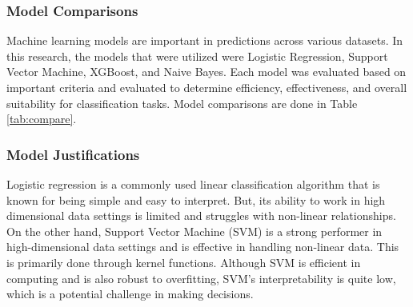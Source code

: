 \documentclass[stu,12pt,floatsintext]{apa7}
\begin{document}
\subsubsection{Model Comparisons}
Machine learning models are important in predictions across various datasets. In this research, the models that were utilized were Logistic Regression, Support Vector Machine, XGBoost, and Naive Bayes. Each model was evaluated based on important criteria and evaluated to determine efficiency, effectiveness, and overall suitability for classification tasks. Model comparisons are done in Table \ref{tab:compare}.

\begin{table}[!htb]
    \centering

    \caption{Theoretical model comparison}

    \label{tab:compare}
\end{table}

\subsubsection{Model Justifications}
Logistic regression is a commonly used linear classification algorithm that is known for being simple and easy to interpret. But, its ability to work in high dimensional data settings is limited and struggles with non-linear relationships. On the other hand, Support Vector Machine (SVM) is a strong performer in high-dimensional data settings and is effective in handling non-linear data. This is primarily done through kernel functions. Although SVM is efficient in computing and is also robust to overfitting, SVM's interpretability is quite low, which is a potential challenge in making decisions. 
\end{document}
